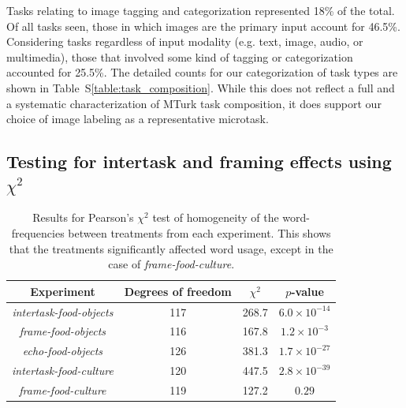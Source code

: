 \documentclass[12pt]{article}
\begin{document}
Tasks relating to image tagging and categorization represented 18\% of the 
total.  Of all tasks seen, those in which images are the primary input
account for 46.5\%.  Considering tasks regardless of input modality (e.g.
text, image, audio, or multimedia), those that involved some kind of tagging
or categorization accounted for 25.5\%.  
The detailed counts for our categorization
of task types are shown in Table~S\ref{table:task_composition}.  
While this does not reflect a full and
a systematic characterization of MTurk task composition, it does support our
choice of image labeling as a representative microtask.

\subsection*{Testing for intertask and framing effects using $\chi^2$}

\begin{table}
\centering
\begin{tabular}{c c c c}
\toprule
Experiment & Degrees of freedom & $\chi^2$ & $p$-value\\
\toprule
\textit{intertask-food-objects} & 117 & 268.7 & $6.0 \times 10^{-14}$\\
\textit{frame-food-objects} & 116 & 167.8 & $1.2 \times 10^{-3}$\\
\textit{echo-food-objects} & 126 & 381.3 & $1.7 \times 10^{-27}$\\
\textit{intertask-food-culture} & 120 & 447.5 & $2.8 \times 10^{-39}$\\
\textit{frame-food-culture} & 119 & 127.2 & $0.29$\\
\bottomrule
\end{tabular}
\caption{
	Results for Pearson's $\chi^2$ test of homogeneity of the word-frequencies
	between treatments from each experiment.  This shows that the treatments
	significantly affected word usage, 
	except in the case of \textit{frame-food-culture}.
}
\label{table:chi2}
\end{table}
\end{document}
